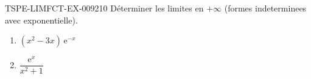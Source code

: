 \begin{exercice}{TSPE-LIMFCT-EX-009}{2}{10}
Déterminer les limites en $+\infty$ (formes indeterminees avec exponentielle).
\begin{enumerate}
  \item $(x^2 - 3x)\,\mathrm{e}^{-x}$
  \item $\dfrac{\mathrm{e}^x}{x^2 + 1}$
\end{enumerate}
\end{exercice}
